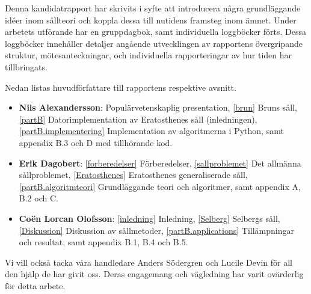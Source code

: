 Denna kandidatrapport har skrivits i syfte att introducera några grundläggande idéer inom sållteori och koppla dessa till nutidens framsteg inom ämnet.
Under arbetets utförande har en gruppdagbok, samt individuella loggböcker förts.
Dessa loggböcker innehåller detaljer angående utvecklingen av rapportens övergripande struktur, mötesanteckningar, och individuella rapporteringar av hur tiden har tillbringats.

Nedan listas huvudförfattare till rapportens respektive avsnitt.
\begin{itemize}
    \item \textbf{Nils Alexandersson}: 
        Populärvetenskaplig presentation,
        \ref{brun} Bruns såll,
        \ref{partB} Datorimplementation av Eratosthenes såll (inledningen),
        \ref{partB.implementering} Implementation av algoritmerna i Python,
        samt appendix B.3 och D med tillhörande kod.
    \item \textbf{Erik Dagobert}: 
        \ref{forberedelser} Förberedelser, 
        \ref{sallproblemet} Det allmänna sållproblemet, 
        \ref{Eratosthenes} Eratosthenes generaliserade såll,
        \ref{partB.algoritmteori} Grundläggande teori och algoritmer,
        samt appendix A, B.2 och C.
    \item \textbf{Coën Lorcan Olofsson}:
        \ref{inledning} Inledning, 
        \ref{Selberg} Selbergs såll,
        \ref{Diskussion} Diskussion av sållmetoder,
        \ref{partB.applications} Tillämpningar och resultat,
        samt appendix B.1, B.4 och B.5.
\end{itemize}
Vi vill också tacka våra handledare Anders Södergren och Lucile Devin för all den hjälp de har givit oss. 
Deras engagemang och vägledning har varit ovärderlig för detta arbete.